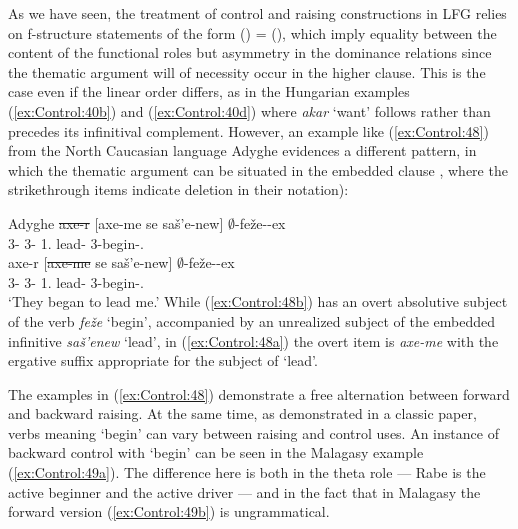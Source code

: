 \documentclass[output=paper,hidelinks]{langscibook}
\begin{document}
As we have seen, the treatment of control and raising constructions in LFG relies on f-structure statements of the form (\UP\SUBJ) = (\UP\XCOMP\SUBJ), which imply equality between the content of the functional roles but asymmetry in the dominance relations since the thematic argument will of necessity occur in the higher clause. This is the case even if the linear order differs, as in the Hungarian examples (\ref{ex:Control:40b}) and (\ref{ex:Control:40d}) where \emph{akar} `want' follows rather than precedes its infinitival complement. However, an example like (\ref{ex:Control:48}) from the North Caucasian language Adyghe evidences a different pattern, in which the thematic argument can be situated in the embedded clause \citep[(1),~(2)]{PotsdamPolinsky2012}, where the strikethrough items indicate deletion in their notation):

\ea\label{ex:Control:48}Adyghe
\ea\label{ex:Control:48a}\gll  \st{axe-r}   [axe-me  se    sa{\v{s}}'e-new] $\emptyset$-fe{\v{z}}e-{\textinvscr}-ex\\
{3\PL-\ABS}  {3\PL-\ERG}  {1\SG.\ABS}  {lead-\INF}  3\ABS-begin-\PL.\ABS\\
\ex\label{ex:Control:48b}\gll  axe-r   [\st{axe-me}  se    sa{\v{s}}'e-new] $\emptyset$-fe{\v{z}}e-{\textinvscr}-ex\\
 {3\PL-\ABS}  {3\PL-\ERG}  {1\SG.\ABS}  {lead-\INF}  3\ABS-begin-\PL.\ABS\\
\glt `They began to lead me.'
\z\z
While (\ref{ex:Control:48b}) has an overt absolutive subject of the verb \emph{fe{\v{z}}e} `begin', accompanied by an unrealized subject of the embedded infinitive \emph{sa{\v{s}}'enew} `lead', in (\ref{ex:Control:48a}) the overt item is \emph{axe-me} with the ergative suffix appropriate for the subject of `lead'.

The examples in (\ref{ex:Control:48}) demonstrate a free alternation between forward and backward raising. At the same time, as \citet{Perlmutter1970} demonstrated in a classic paper, verbs meaning `begin' can vary between raising and control uses. An instance of backward control with `begin' can be seen in the Malagasy example (\ref{ex:Control:49a}). The difference here is both in the theta role --- Rabe is the active beginner and the active driver --- and in the fact that in Malagasy the forward version (\ref{ex:Control:49b}) is ungrammatical.
\end{document}
